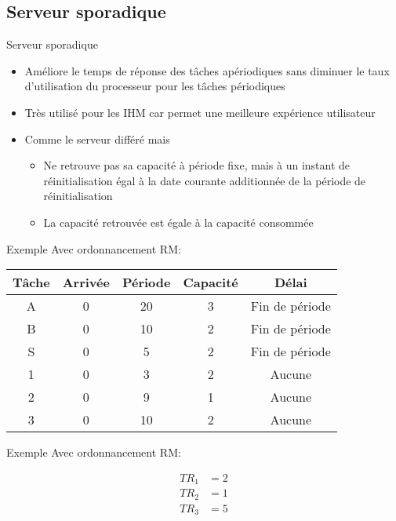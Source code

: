 \subsection{Serveur sporadique}

\begin{frame}{Serveur sporadique}
  \begin{itemize}
  \item  Améliore le  temps de  réponse des  tâches  apériodiques sans
    diminuer  le  taux d'utilisation  du  processeur  pour les  tâches
    périodiques
  \item Très utilisé pour les  IHM car permet une meilleure expérience
    utilisateur
  \item Comme le serveur différé mais 
    \begin{itemize}
    \item  Ne retrouve  pas  sa capacité  à  période fixe,  mais à  un
      instant de réinitialisation égal  à la date courante additionnée
      de la période de réinitialisation
      \item La capacité retrouvée est égale à la capacité consommée 
      \end{itemize}
    \end{itemize}
\end{frame} 

\begin{frame}{Exemple}
  Avec ordonnancement RM:
  \begin{center}
    \begin{tabular}{ccccc}
      \hline
      Tâche & Arrivée & Période & Capacité & Délai \\
      \hline
      A & 0 & 20 & 3 & Fin de période\\
      B & 0 & 10 & 2 & Fin de période\\
      S & 0 &  5 & 2 & Fin de période\\
      1 & 0 &  3 & 2 & Aucune\\
      2 & 0 &  9 & 1 & Aucune\\
      3 & 0 & 10 & 2 & Aucune\\
      \hline
    \end{tabular}
    \pause
  
  \end{center}
\end{frame} 

\begin{frame}{Exemple}
  Avec ordonnancement RM:
  \begin{center}
    
    \begin{align*}
      TR_1 &= 2\\
      TR_2 &= 1\\
      TR_3 &= 5\\
    \end{align*}
  \end{center}
\end{frame} 


